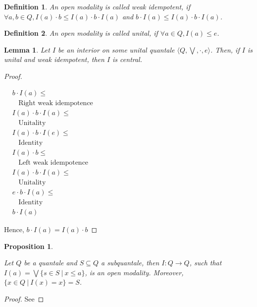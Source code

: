 \documentclass[a4paper]{article}
\newtheorem{prop}{Proposition}
\newtheorem{lemma}{Lemma}
\newtheorem{defin}{Definition}
\begin{document}
\begin{defin}
  An open modality is called weak idempotent, if $\forall a, b \in Q, I(a) \cdot b \leq I(a) \cdot b \cdot I(a)$ and
  $b \cdot I(a) \leq I(a) \cdot b \cdot I(a)$.
\end{defin}

\begin{defin}
  An open modality is called unital, if $\forall a \in Q, I(a) \leq e$.
\end{defin}

\begin{lemma}
  Let $I$ be an interior on some unital quantale $\langle Q, \bigvee, \cdot, e \rangle$.
  Then, if $I$ is unital and weak idempotent, then $I$ is central.
\end{lemma}

\begin{proof}
$ $

  $\begin{array}{lll}
  & b \cdot I(a) \leq & \\
  & \:\:\:\: \text{Right weak idempotence}& \\
  &I(a) \cdot b \cdot I(a) \leq & \\
  & \:\:\:\: \text{Unitality}& \\
  & I(a) \cdot b \cdot I(e) \leq & \\
  & \:\:\:\: \text{Identity}& \\
  &I(a) \cdot b \leq & \\
  & \:\:\:\: \text{Left weak idempotence}& \\
  &I(a) \cdot b \cdot I(a) \leq & \\
  & \:\:\:\: \text{Unitality}& \\
  &e \cdot b \cdot I(a) \leq & \\
  & \:\:\:\: \text{Identity}& \\
  &b \cdot I(a)&
  \end{array}$

Hence, $b \cdot I(a) = I(a) \cdot b$

\end{proof}

\begin{prop}
$ $

  Let $Q$ be a quantale and $S \subseteq Q$ a subquantale, then $I : Q \to Q$, such that
$I(a) = \bigvee \{ s \in S \: | \: x \leq a \}$, is an open modality. Moreover, $\{ x \in Q \: | \: I(x) = x\} = S$.
\end{prop}

\begin{proof}
  See
\end{proof}
\end{document}
